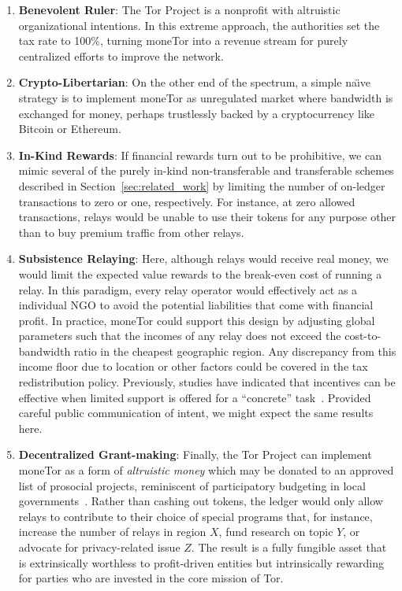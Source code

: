 \begin{enumerate}

\item \textbf{Benevolent Ruler}: The Tor Project is a nonprofit with altruistic organizational intentions.
  In this extreme approach, the authorities set the tax rate to 100\%, turning moneTor into a revenue stream for purely centralized efforts to improve the network.

\item \textbf{Crypto-Libertarian}: On the other end of the spectrum, a simple na\"{\i}ve strategy is to implement moneTor as unregulated market where bandwidth is exchanged for money, perhaps trustlessly backed by a cryptocurrency like Bitcoin or Ethereum.

\item \textbf{In-Kind Rewards}: If financial rewards turn out to be prohibitive, we can mimic several of the purely in-kind non-transferable and transferable schemes described in Section~\ref{sec:related_work} by limiting the number of on-ledger transactions to zero or one, respectively.
  For instance, at zero allowed transactions, relays would be unable to use their tokens for any purpose other than to buy premium traffic from other relays.

\item \textbf{Subsistence Relaying}: Here, although relays would receive real money, we would limit the expected value rewards to the break-even cost of running a relay.
In this paradigm, every relay operator would effectively act as a individual NGO to avoid the potential liabilities that come with financial profit.
In practice, moneTor could support this design by adjusting global parameters such that the incomes of any relay does not exceed the cost-to-bandwidth ratio in the cheapest geographic region.
Any discrepancy from this income floor due to location or other factors could be covered in the tax redistribution policy.
Previously, studies have indicated that incentives can be effective when limited support is offered for a ``concrete'' task~\cite{10.1257/jep.25.4.191, 10.1086/431263}.
Provided careful public communication of intent, we might expect the same results here.

\item \textbf{Decentralized Grant-making}: Finally, the Tor Project can implement moneTor as a form of \emph{altruistic money} which may be donated to an approved list of prosocial projects, reminiscent of participatory budgeting in local governments~\cite{cabannes2004participatory}.
Rather than cashing out tokens, the ledger would only allow relays to contribute to their choice of special programs that, for instance, increase the number of relays in region $X$, fund research on topic $Y$, or advocate for privacy-related issue $Z$.
The result is a fully fungible asset that is extrinsically worthless to profit-driven entities but intrinsically rewarding for parties who are invested in the core mission of Tor.

\end{enumerate}

